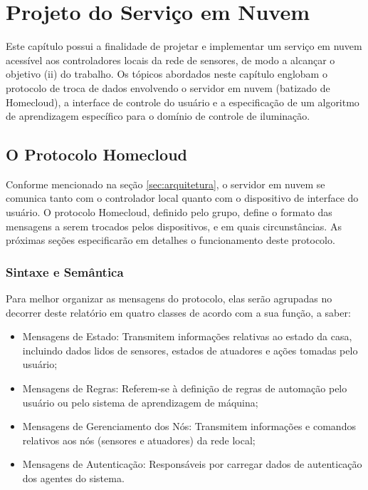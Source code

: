 \chapter{Projeto do Serviço em Nuvem}\label{chp:serviconuvem}
Este capítulo possui a finalidade de projetar e implementar um serviço em nuvem acessível aos controladores locais da rede de sensores, de modo a alcançar o objetivo (ii) do trabalho. Os tópicos abordados neste capítulo englobam o protocolo de troca de dados envolvendo o servidor em nuvem (batizado de Homecloud), a interface de controle do usuário e a especificação de um algoritmo de aprendizagem específico para o domínio de controle de iluminação.

\section{O Protocolo Homecloud} \label{sec:homecloud}
Conforme mencionado na seção \ref{sec:arquitetura}, o servidor em nuvem se comunica tanto com o controlador local quanto com o dispositivo de interface do usuário. O protocolo Homecloud, definido pelo grupo, define o formato das mensagens a serem trocados pelos dispositivos, e em quais circunstâncias. As próximas seções especificarão em detalhes o funcionamento deste protocolo.

\subsection{Sintaxe e Semântica} \label{subsec:hc_sintaxe}
Para melhor organizar as mensagens do protocolo, elas serão agrupadas no decorrer deste relatório em quatro classes de acordo com a sua função, a saber:

\begin{itemize}
	\item Mensagens de Estado: Transmitem informações relativas ao estado da casa, incluindo dados lidos de sensores, estados de atuadores e ações tomadas pelo usuário;
	\item Mensagens de Regras: Referem-se à definição de regras de automação pelo usuário ou pelo sistema de aprendizagem de máquina;
	\item Mensagens de Gerenciamento dos Nós: Transmitem informações e comandos relativos aos nós (sensores e atuadores) da rede local;
	\item Mensagens de Autenticação: Responsáveis por carregar dados de autenticação dos agentes do sistema.
\end{itemize}

